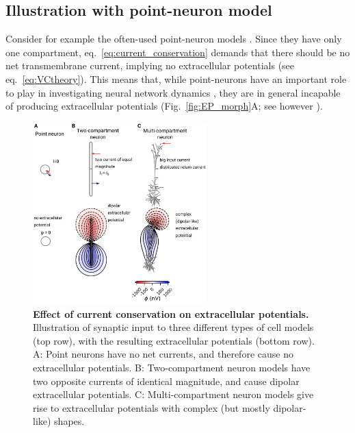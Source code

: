\documentclass[preprint,11pt,authoryear]{elsarticle}
\begin{document}
\subsection*{Illustration with point-neuron model}
Consider for example the often-used point-neuron models \citep{Sterratt2011}. Since they have only one compartment, eq.~\ref{eq:current_conservation} demands that there should be no net transmembrane current, implying no extracellular potentials (see eq.~\ref{eq:VCtheory}). This means that, while point-neurons have an important role to play in investigating neural network dynamics \citep{Einevoll2019}, they are in general incapable of producing extracellular potentials (Fig.~\ref{fig:EP_morph}A; see however \cite{Mazzoni2015, Hagen2016}). 

\begin{figure}[ht!]
\begin{center}
\includegraphics[width=0.6\textwidth]{dipoles}
\end{center}
\caption{\textbf{Effect of current conservation on extracellular potentials.} 
Illustration of synaptic input to three different types of cell models (top row), with the resulting extracellular potentials (bottom row). 
A: Point neurons have no net currents, and therefore cause no extracellular potentials. B: Two-compartment neuron models have two opposite currents
of identical magnitude, and cause dipolar extracellular potentials. C: Multi-compartment neuron models \citep{Hay2011} give rise to extracellular potentials with complex (but mostly dipolar-like) shapes.}
\label{fig:EP_morph_}
\end{figure}
\end{document}
